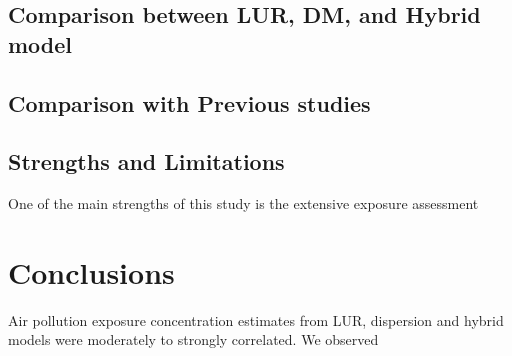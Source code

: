 \documentclass{article}
\begin{document}
\subsection{Comparison between LUR, DM, and Hybrid model}






\subsection{Comparison with Previous studies}




\subsection{Strengths and Limitations}
One of the main strengths of this study is the extensive exposure assessment 

\section{Conclusions}

Air pollution exposure concentration estimates from LUR, dispersion and hybrid models were moderately to strongly correlated. We observed 



































\newpage


\end{document}
